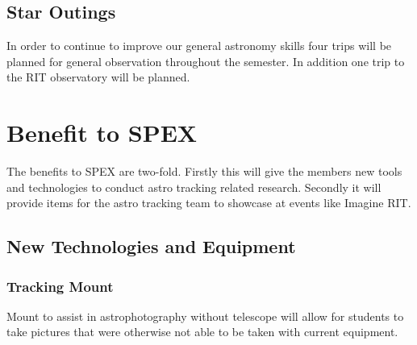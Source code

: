 \documentclass[conference]{IEEEtran} %
\begin{document}
    \subsection{Star Outings}
    \label{subsec:generaloutings}
        In order to continue to improve our general astronomy skills four trips will be planned for general observation throughout the semester.  In addition one trip to the RIT observatory will be planned.





\section{Benefit to SPEX}
\label{sec:benefit}

The benefits to SPEX are two-fold.  Firstly this will give the members new tools and technologies to conduct astro tracking related research.  Secondly it will provide items for the astro tracking team to showcase at events like Imagine RIT.

\subsection{New Technologies and Equipment}
    \subsubsection{Tracking Mount}
    \label{sec:trackingmount}
    Mount to assist in astrophotography without telescope will allow for students to take pictures that were otherwise not able to be taken with current equipment.
\end{document}
